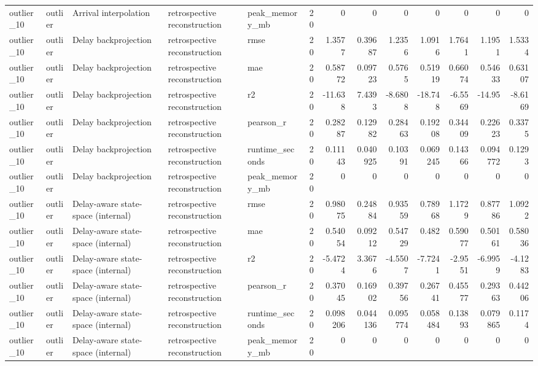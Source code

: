 \begin{table}[!htbp]
{{\begin{tabular}{lllllrrrrrrrr}
outlier_10 & outlier & Arrival interpolation & retrospective reconstruction & peak_memory_mb & 20 & 0 & 0 & 0 & 0 & 0 & 0 & 0 \\
outlier_10 & outlier & Delay backprojection & retrospective reconstruction & rmse & 20 & 1.3577 & 0.39687 & 1.2356 & 1.0916 & 1.7641 & 1.1951 & 1.5334 \\
outlier_10 & outlier & Delay backprojection & retrospective reconstruction & mae & 20 & 0.58772 & 0.09723 & 0.5765 & 0.51919 & 0.66074 & 0.54633 & 0.63107 \\
outlier_10 & outlier & Delay backprojection & retrospective reconstruction & r2 & 20 & -11.638 & 7.4393 & -8.6808 & -18.748 & -6.5569 & -14.95 & -8.6169 \\
outlier_10 & outlier & Delay backprojection & retrospective reconstruction & pearson_r & 20 & 0.28287 & 0.12982 & 0.28463 & 0.19208 & 0.34409 & 0.22623 & 0.3375 \\
outlier_10 & outlier & Delay backprojection & retrospective reconstruction & runtime_seconds & 20 & 0.11143 & 0.040925 & 0.10391 & 0.069245 & 0.14366 & 0.094772 & 0.1293 \\
outlier_10 & outlier & Delay backprojection & retrospective reconstruction & peak_memory_mb & 20 & 0 & 0 & 0 & 0 & 0 & 0 & 0 \\
outlier_10 & outlier & Delay-aware state-space (internal) & retrospective reconstruction & rmse & 20 & 0.98075 & 0.24884 & 0.93559 & 0.78968 & 1.1729 & 0.87786 & 1.0922 \\
outlier_10 & outlier & Delay-aware state-space (internal) & retrospective reconstruction & mae & 20 & 0.54054 & 0.09212 & 0.54729 & 0.482 & 0.59077 & 0.50161 & 0.58036 \\
outlier_10 & outlier & Delay-aware state-space (internal) & retrospective reconstruction & r2 & 20 & -5.4724 & 3.3676 & -4.5507 & -7.7241 & -2.9551 & -6.9959 & -4.1283 \\
outlier_10 & outlier & Delay-aware state-space (internal) & retrospective reconstruction & pearson_r & 20 & 0.37045 & 0.16902 & 0.39756 & 0.26741 & 0.45577 & 0.29363 & 0.44206 \\
outlier_10 & outlier & Delay-aware state-space (internal) & retrospective reconstruction & runtime_seconds & 20 & 0.098206 & 0.044136 & 0.095774 & 0.058484 & 0.13893 & 0.079865 & 0.1174 \\
outlier_10 & outlier & Delay-aware state-space (internal) & retrospective reconstruction & peak_memory_mb & 20 & 0 & 0 & 0 & 0 & 0 & 0 & 0 \\

\end{tabular}}}
\end{table}
